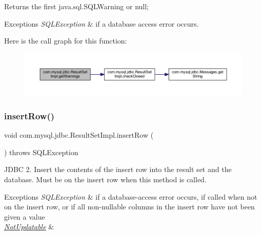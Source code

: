 \begin{DoxyReturn}{Returns}
the first java.\+sql.\+S\+Q\+L\+Warning or null;
\end{DoxyReturn}

\begin{DoxyExceptions}{Exceptions}
{\em S\+Q\+L\+Exception} & if a database access error occurs. \\
\hline
\end{DoxyExceptions}
Here is the call graph for this function\+:
\nopagebreak
\begin{figure}[H]
\begin{center}
\leavevmode
\includegraphics[width=350pt]{classcom_1_1mysql_1_1jdbc_1_1_result_set_impl_a1f40b1109e74ab3c59104273b350d8e2_cgraph}
\end{center}
\end{figure}
\mbox{\label{classcom_1_1mysql_1_1jdbc_1_1_result_set_impl_a78e304e3279cbcf60392f18c1385e3bf}} 
\subsubsection{\texorpdfstring{insert\+Row()}{insertRow()}}
{\footnotesize\ttfamily void com.\+mysql.\+jdbc.\+Result\+Set\+Impl.\+insert\+Row (\begin{DoxyParamCaption}{ }\end{DoxyParamCaption}) throws S\+Q\+L\+Exception}

J\+D\+BC 2. Insert the contents of the insert row into the result set and the database. Must be on the insert row when this method is called.


\begin{DoxyExceptions}{Exceptions}
{\em S\+Q\+L\+Exception} & if a database-\/access error occurs, if called when not on the insert row, or if all non-\/nullable columns in the insert row have not been given a value \\
\hline
{\em \mbox{\hyperlink{classcom_1_1mysql_1_1jdbc_1_1_not_updatable}{Not\+Updatable}}} & \\
\hline
\end{DoxyExceptions}
\mbox{\label{classcom_1_1mysql_1_1jdbc_1_1_result_set_impl_aad87b9e19492ef903b73d29a98b32e7e}} 
